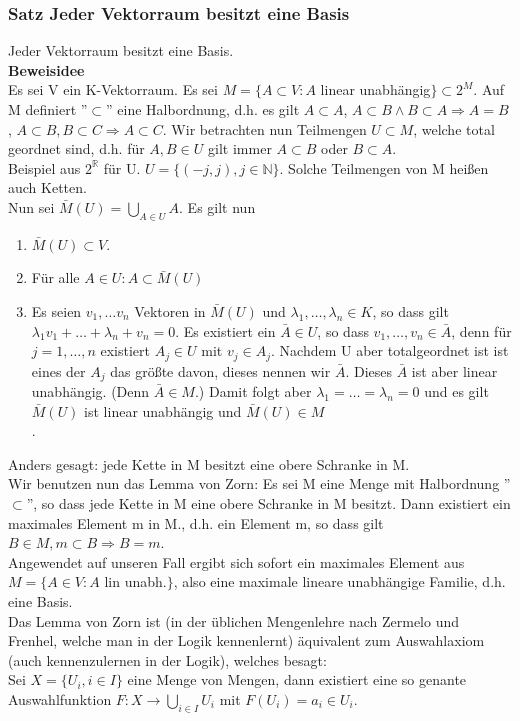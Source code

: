 \documentclass{scrartcl}
\newcommand{\lb}{\lambda}
\newcommand{\R}{\mathbb{R}}
\newcommand{\N}{\mathbb{N}}
\begin{document}
\subsubsection{Satz Jeder Vektorraum besitzt eine Basis}
Jeder Vektorraum besitzt eine Basis.\\
\textbf{Beweisidee}\\
Es sei V ein K-Vektorraum. Es sei \(M = \{A \subset V : A\) linear unabh\"angig\(\} \subset 2^M\). Auf M definiert ''\(\subset\)'' eine Halbordnung, d.h. es gilt \(A \subset A\), \(A \subset B \land B \subset A \Rightarrow A = B\), \(A \subset B, B \subset C \Rightarrow A \subset C\). Wir betrachten nun Teilmengen \(U \subset M\), welche total geordnet sind, d.h. f\"ur \(A, B \in U\) gilt immer \(A \subset B\) oder \(B \subset A\).\\
Beispiel aus \(2^\R\) f\"ur U. \(U = \{(-j, j), j \in \N\}\). Solche Teilmengen von M hei\ss{}en auch Ketten.\\ Nun sei \(\bar{M}(U) = \bigcup_{A \in U} A\). Es gilt nun 
\begin{enumerate}
\item{\(\bar{M}(U) \subset V\).}
\item{F\"ur alle \(A \in U : A \subset \bar{M}(U)\)}
\item{Es seien \(v_1, \dots v_n\) Vektoren in \(\bar{M}(U)\) und \(\lb_1, \dots, \lb_n \in K\), so dass gilt \(\lb_1 v_1 + \dots + \lb_n + v_n = 0\). Es existiert ein \(\bar{A} \in U\), so dass \(v_1, \dots, v_n \in \bar{A}\), denn f\"ur \(j = 1, \dots, n\) existiert \(A_j \in U\) mit \(v_j \in A_j\). Nachdem U aber totalgeordnet ist  ist eines der \(A_j\) das gr\"o\ss{}te davon, dieses nennen wir \(\bar{A}\). Dieses \(\bar{A}\) ist aber linear unabh\"angig. (Denn \(\bar{A} \in M\).) Damit folgt aber \(\lb_1 = \dots = \lb_n = 0\) und es gilt \(\bar{M}(U)\) ist linear unabh\"angig und \(\bar{M}(U) \in M\)\\}.
\end{enumerate}
Anders gesagt: jede Kette in M besitzt eine obere Schranke in M.\\
Wir benutzen nun das Lemma von Zorn: Es sei M eine Menge mit Halbordnung ''\(\subset\)'', so dass jede Kette in M eine obere Schranke in M besitzt. Dann existiert ein maximales Element m in M., d.h. ein Element m, so dass gilt \(B \in M, m \subset B \Rightarrow B = m\).\\ Angewendet auf unseren Fall ergibt sich sofort ein maximales Element aus \(M = \{A \in V : A\) lin unabh.\(\}\), also eine maximale lineare unabh\"angige Familie, d.h. eine Basis.\\
Das Lemma von Zorn ist (in der \"ublichen Mengenlehre nach Zermelo und Frenhel, welche man in der Logik kennenlernt) \"aquivalent zum Auswahlaxiom (auch kennenzulernen in der Logik), welches besagt:\\
Sei \(X = \{U_i, i \in I\}\) eine Menge von Mengen, dann existiert eine so genante Auswahlfunktion \(F : X \to \bigcup_{i \in I} U_i\) mit \(F(U_i) = a_i \in U_i\).
\end{document}
